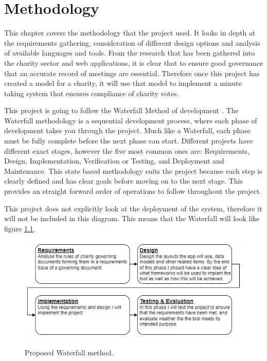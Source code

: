 \documentclass{UoYCSproject}
\begin{document}
\chapter{Methodology}
\label{cha:methodology}
This chapter covers the methodology that the project used. It looks in depth at the requirements gathering, consideration of different design options and analysis of available languages and tools. From the research that has been gathered into the charity sector and web applications, it is clear that to ensure good governance that an accurate record of meetings are essential. Therefore once this project has created a model for a charity, it will use that model to implement a minute taking system that ensures compliance of charity votes.

This project is going to follow the Waterfall Method of development \cite{waterfall_method}. The Waterfall methodology is a sequential development process, where each phase of development takes you through the project. Much like a Waterfall, each phase must be fully complete before the next phase can start. Different projects have different exact stages, however the five most common ones are: 
Requirements, Design, Implementation, Verification or Testing, and Deployment and Maintenance. This state based methodology suits the project because each step is clearly defined and has clear goals before moving on to the next stage. This provides an straight forward order of operations to follow throughout the project.

This project does not explicitly look at the deployment of the system, therefore it will not be included in this diagram. This means that the Waterfall will look like figure \ref{fig:waterfall}. 

\begin{figure}[htb]
\begin{center}
\includegraphics[height=5cm]{"./assets/methodology-assets/Waterfall v2.png"}
\label{fig:waterfall}
\end{center}
\caption{Proposed Waterfall method.}
\end{figure}
\end{document}
